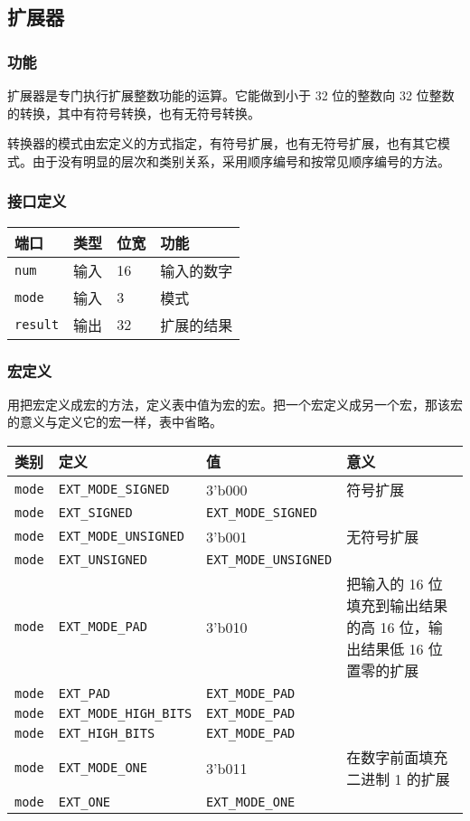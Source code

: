 \hypertarget{ux6269ux5c55ux5668}{%
\subsection{扩展器}\label{ux6269ux5c55ux5668}}

\hypertarget{ux529fux80fd-5}{%
\subsubsection{功能}\label{ux529fux80fd-5}}

扩展器是专门执行扩展整数功能的运算。它能做到小于 32 位的整数向 32
位整数的转换，其中有符号转换，也有无符号转换。

转换器的模式由宏定义的方式指定，有符号扩展，也有无符号扩展，也有其它模式。由于没有明显的层次和类别关系，采用顺序编号和按常见顺序编号的方法。

\hypertarget{ux63a5ux53e3ux5b9aux4e49-1}{%
\subsubsection{接口定义}\label{ux63a5ux53e3ux5b9aux4e49-1}}

\begin{longtable}[]{@{}llll@{}}
\toprule
端口 & 类型 & 位宽 & 功能\tabularnewline
\midrule
\endhead
\texttt{num} & 输入 & 16 & 输入的数字\tabularnewline
\texttt{mode} & 输入 & 3 & 模式\tabularnewline
\texttt{result} & 输出 & 32 & 扩展的结果\tabularnewline
\bottomrule
\end{longtable}

\hypertarget{ux5b8fux5b9aux4e49-4}{%
\subsubsection{宏定义}\label{ux5b8fux5b9aux4e49-4}}

用把宏定义成宏的方法，定义表中值为宏的宏。把一个宏定义成另一个宏，那该宏的意义与定义它的宏一样，表中省略。

\begin{longtable}[]{@{}llll@{}}
\toprule
类别 & 定义 & 值 & 意义\tabularnewline
\midrule
\endhead
\texttt{mode} & \texttt{EXT\_MODE\_SIGNED} & 3'b000 &
符号扩展\tabularnewline
\texttt{mode} & \texttt{EXT\_SIGNED} & \texttt{EXT\_MODE\_SIGNED}
&\tabularnewline
\texttt{mode} & \texttt{EXT\_MODE\_UNSIGNED} & 3'b001 &
无符号扩展\tabularnewline
\texttt{mode} & \texttt{EXT\_UNSIGNED} & \texttt{EXT\_MODE\_UNSIGNED}
&\tabularnewline
\texttt{mode} & \texttt{EXT\_MODE\_PAD} & 3'b010 & 把输入的 16
位填充到输出结果的高 16 位，输出结果低 16 位置零的扩展\tabularnewline
\texttt{mode} & \texttt{EXT\_PAD} & \texttt{EXT\_MODE\_PAD}
&\tabularnewline
\texttt{mode} & \texttt{EXT\_MODE\_HIGH\_BITS} & \texttt{EXT\_MODE\_PAD}
&\tabularnewline
\texttt{mode} & \texttt{EXT\_HIGH\_BITS} & \texttt{EXT\_MODE\_PAD}
&\tabularnewline
\texttt{mode} & \texttt{EXT\_MODE\_ONE} & 3'b011 & 在数字前面填充二进制
1 的扩展\tabularnewline
\texttt{mode} & \texttt{EXT\_ONE} & \texttt{EXT\_MODE\_ONE}
&\tabularnewline
\bottomrule
\end{longtable}

